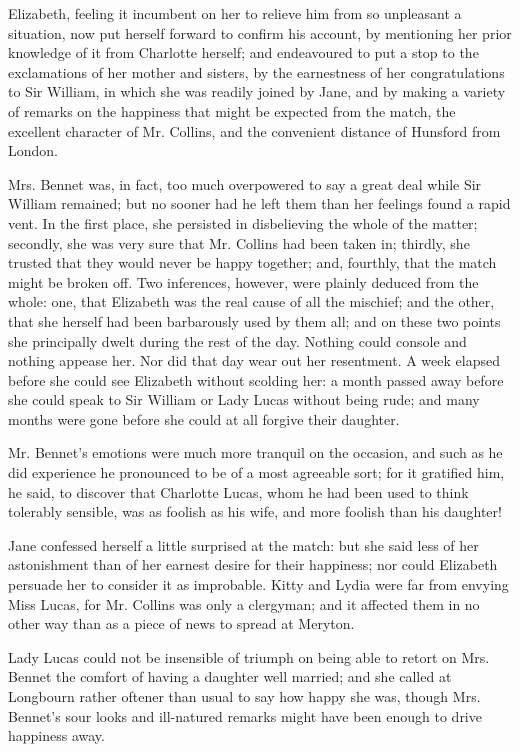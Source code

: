 Elizabeth, feeling it incumbent on her to relieve him from so unpleasant a situation, now put herself forward to confirm his account, by mentioning her prior knowledge of it from Charlotte herself; and endeavoured to put a stop to the exclamations of her mother and sisters, by the earnestness of her congratulations to Sir William, in which she was readily joined by Jane, and by making a variety of remarks on the happiness that might be expected from the match, the excellent character of Mr. Collins, and the convenient distance of Hunsford from London.

Mrs. Bennet was, in fact, too much overpowered to say a great deal while Sir William remained; but no sooner had he left them than her feelings found a rapid vent. In the first place, she persisted in disbelieving the whole of the matter; secondly, she was very sure that Mr. Collins had been taken in; thirdly, she trusted that they would never be happy together; and, fourthly, that the match might be broken off. Two inferences, however, were plainly deduced from the whole: one, that Elizabeth was the real cause of all the mischief; and the other, that she herself had been barbarously used by them all; and on these two points she principally dwelt during the rest of the day. Nothing could console and nothing appease her. Nor did that day wear out her resentment. A week elapsed before she could see Elizabeth without scolding her: a month passed away before she could speak to Sir William or Lady Lucas without being rude; and many months were gone before she could at all forgive their daughter.

Mr. Bennet's emotions were much more tranquil on the occasion, and such as he did experience he pronounced to be of a most agreeable sort; for it gratified him, he said, to discover that Charlotte Lucas, whom he had been used to think tolerably sensible, was as foolish as his wife, and more foolish than his daughter!

Jane confessed herself a little surprised at the match: but she said less of her astonishment than of her earnest desire for their happiness; nor could Elizabeth persuade her to consider it as improbable. Kitty and Lydia were far from envying Miss Lucas, for Mr. Collins was only a clergyman; and it affected them in no other way than as a piece of news to spread at Meryton.

Lady Lucas could not be insensible of triumph on being able to retort on Mrs. Bennet the comfort of having a daughter well married; and she called at Longbourn rather oftener than usual to say how happy she was, though Mrs. Bennet's sour looks and ill-natured remarks might have been enough to drive happiness away.

